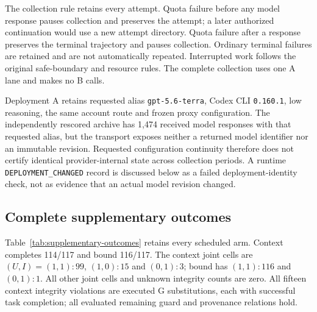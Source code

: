 \documentclass[11pt,a4paper]{article}
\newcommand{\code}[1]{\nolinkurl{#1}}
\begin{document}
The collection rule retains every attempt. Quota failure before any model response pauses collection and preserves the attempt; a later authorized continuation would use a new attempt directory. Quota failure after a response preserves the terminal trajectory and pauses collection. Ordinary terminal failures are retained and are not automatically repeated. Interrupted work follows the original safe-boundary and resource rules. The complete collection uses one A lane and makes no B calls.

Deployment A retains requested alias \code{gpt-5.6-terra}, Codex CLI \code{0.160.1}, low reasoning, the same account route and frozen proxy configuration. The independently rescored archive has 1,474 received model responses with that requested alias, but the transport exposes neither a returned model identifier nor an immutable revision. Requested configuration continuity therefore does not certify identical provider-internal state across collection periods. A runtime \code{DEPLOYMENT_CHANGED} record is discussed below as a failed deployment-identity check, not as evidence that an actual model revision changed.

\subsection{Complete supplementary outcomes}
Table~\ref{tab:supplementary-outcomes} retains every scheduled arm. Context completes 114/117 and bound 116/117. The context joint cells are $(U,I)=(1,1):99$, $(1,0):15$ and $(0,1):3$; bound has $(1,1):116$ and $(0,1):1$. All other joint cells and unknown integrity counts are zero. All fifteen context integrity violations are executed G substitutions, each with successful task completion; all evaluated remaining guard and provenance relations hold.
\end{document}
